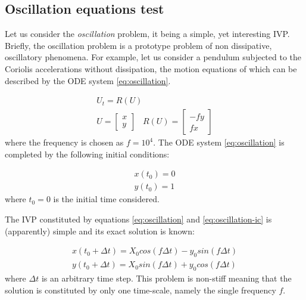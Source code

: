 \subsection{Oscillation equations test}

Let us consider the \emph{oscillation} problem, it being a simple, yet interesting IVP. Briefly, the oscillation problem is a prototype problem of non dissipative, oscillatory phenomena. For example, let us consider a pendulum subjected to the Coriolis accelerations without dissipation, the motion equations of which can be described by the ODE system \ref{eq:oscillation}.

\begin{equation}
\begin{matrix}
U_t = R(U)  \\
U = \begin{bmatrix}
x \\
y
\end{bmatrix}\;\;\;
R(U) = \begin{bmatrix}
-f y \\
f x
\end{bmatrix}
\end{matrix}
\label{eq:oscillation}
\end{equation}
where the frequency is chosen as $f=10^4$. The ODE system \ref{eq:oscillation} is completed by the following initial conditions:

\begin{equation}
\begin{matrix}
  x(t_0) = 0 \\
  y(t_0) = 1
\end{matrix}
\label{eq:oscillation-ic}
\end{equation}
where $t_0=0$ is the initial time considered.

The IVP constituted by equations \ref{eq:oscillation} and \ref{eq:oscillation-ic} is (apparently) simple and its exact solution is known:

\begin{equation}
\begin{matrix}
  x(t_0 + \Delta t) = X_0 cos(f \Delta t) - y_0 sin(f \Delta t) \\
  y(t_0 + \Delta t) = X_0 sin(f \Delta t) + y_0 cos(f \Delta t)
\end{matrix}
\label{eq:oscillation-exact}
\end{equation}
where $\Delta t$ is an arbitrary time step. This problem is non-stiff meaning that the solution is constituted by only one time-scale, namely the single frequency $f$.

